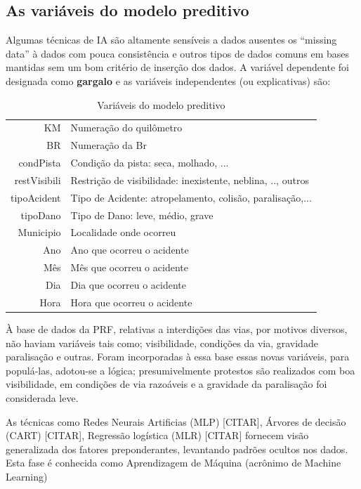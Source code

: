 \subsection{ As variáveis do modelo preditivo}

Algumas técnicas de IA são altamente sensíveis a dados ausentes os ``missing data'' à dados com pouca consistência e outros tipos de dados 
comuns em bases mantidas sem um bom critério de inserção dos dados. 
A variável dependente foi designada como \textbf{gargalo} e as variáveis independentes (ou explicativas) são:


\begin{table}[htbp]
 \centering
  \caption{Variáveis do modelo preditivo}
  
  \begin{tabular}{r|l} \hline
   KM & Numeração do quilômetro \\
   BR & Numeração da Br\\
   condPista & Condição da pista: seca, molhado, ... \\
   restVisibili & Restrição de visibilidade: inexistente, neblina, .., outros \\
   tipoAcident & Tipo de Acidente: atropelamento, colisão, paralisação,...\\
   tipoDano  & Tipo de Dano: leve, médio, grave \\
   Municipio  & Localidade onde ocorreu \\
   Ano & Ano que ocorreu o acidente \\
   Mês & Mês que ocorreu o acidente \\
   Dia & Dia que ocorreu o acidente \\
   Hora & Hora que ocorreu o acidente \\
  \end{tabular}
\end{table}



 
À base de dados da PRF, relativas a interdições das vias, por motivos diversos, não haviam variáveis tais como; visibilidade, condições da via, gravidade paralisação e outras.
Foram incorporadas à essa base essas novas variáveis, para populá-las, adotou-se a lógica; presumivelmente protestos são realizados com boa visibilidade, em condições de via razoáveis e a gravidade da paralisação foi considerada leve.

As técnicas como Redes Neurais Artificias (MLP) [\large{CITAR}], Árvores de decisão (CART) [\large{CITAR}], Regressão logística (MLR) 
[\large{CITAR}] fornecem visão generalizada dos fatores preponderantes, levantando padrões ocultos nos dados. Esta fase é conhecida como 
Aprendizagem de Máquina (acrônimo de Machine Learning)

